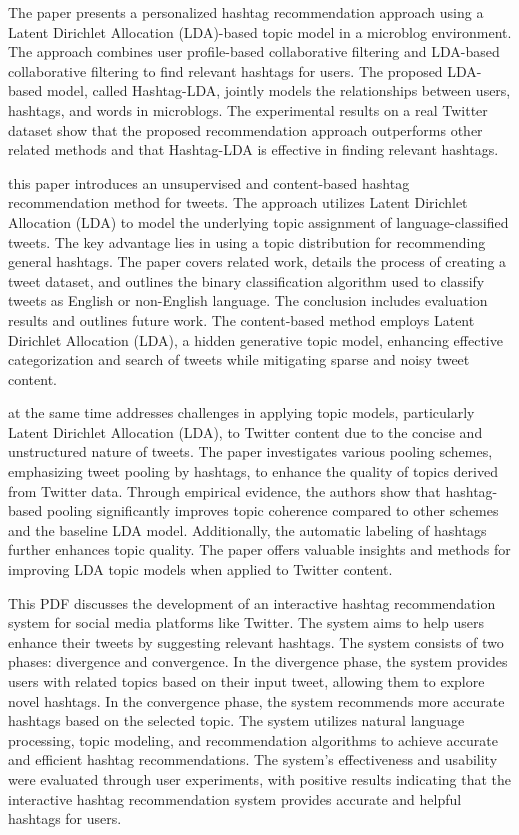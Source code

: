 \cite{zhao2016personalized} The paper presents a personalized hashtag recommendation approach using a Latent Dirichlet Allocation (LDA)-based topic model in a microblog environment. The approach combines user profile-based collaborative filtering and LDA-based collaborative filtering to find relevant hashtags for users. The proposed LDA-based model, called Hashtag-LDA, jointly models the relationships between users, hashtags, and words in microblogs. The experimental results on a real Twitter dataset show that the proposed recommendation approach outperforms other related methods and that Hashtag-LDA is effective in finding relevant hashtags.

\cite{godin2013using} this paper introduces an unsupervised and content-based hashtag recommendation method for tweets. The approach utilizes Latent Dirichlet Allocation (LDA) to model the underlying topic assignment of language-classified tweets. The key advantage lies in using a topic distribution for recommending general hashtags. The paper covers related work, details the process of creating a tweet dataset, and outlines the binary classification algorithm used to classify tweets as English or non-English language. The conclusion includes evaluation results and outlines future work. The content-based method employs Latent Dirichlet Allocation (LDA), a hidden generative topic model, enhancing effective categorization and search of tweets while mitigating sparse and noisy tweet content.

\cite{mehrotra2013improving} at the same time addresses challenges in applying topic models, particularly Latent Dirichlet Allocation (LDA), to Twitter content due to the concise and unstructured nature of tweets. The paper investigates various pooling schemes, emphasizing tweet pooling by hashtags, to enhance the quality of topics derived from Twitter data. Through empirical evidence, the authors show that hashtag-based pooling significantly improves topic coherence compared to other schemes and the baseline LDA model. Additionally, the automatic labeling of hashtags further enhances topic quality. The paper offers valuable insights and methods for improving LDA topic models when applied to Twitter content.

This PDF discusses the development of an interactive hashtag recommendation system for social media platforms like Twitter. The system aims to help users enhance their tweets by suggesting relevant hashtags. The system consists of two phases: divergence and convergence. In the divergence phase, the system provides users with related topics based on their input tweet, allowing them to explore novel hashtags. In the convergence phase, the system recommends more accurate hashtags based on the selected topic. The system utilizes natural language processing, topic modeling, and recommendation algorithms to achieve accurate and efficient hashtag recommendations. The system's effectiveness and usability were evaluated through user experiments, with positive results indicating that the interactive hashtag recommendation system provides accurate and helpful hashtags for users.

